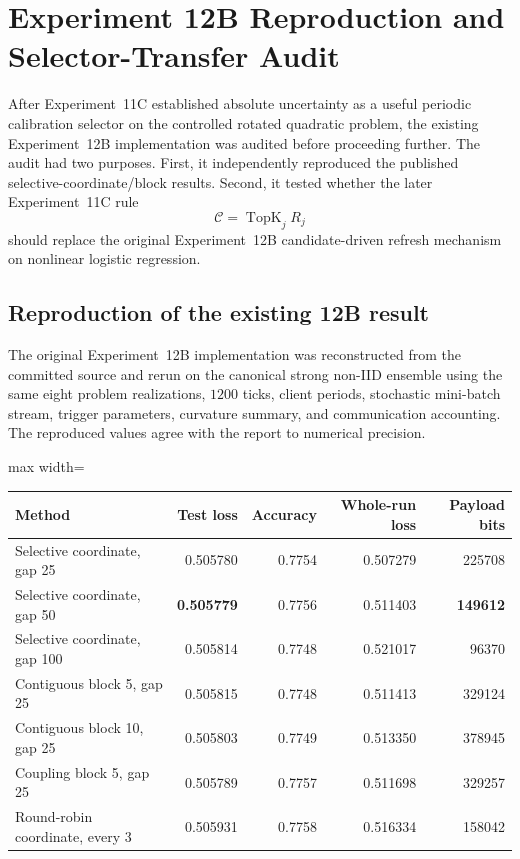 \section{Experiment 12B Reproduction and Selector-Transfer Audit}
\label{sec:exp12b-audit}

After Experiment~11C established absolute uncertainty as a useful periodic calibration selector on the controlled rotated quadratic problem, the existing Experiment~12B implementation was audited before proceeding further. The audit had two purposes. First, it independently reproduced the published selective-coordinate/block results. Second, it tested whether the later Experiment~11C rule
\begin{equation}
  \mathcal C=\operatorname{TopK}_j R_j
\end{equation}
should replace the original Experiment~12B candidate-driven refresh mechanism on nonlinear logistic regression.

\subsection{Reproduction of the existing 12B result}

The original Experiment~12B implementation was reconstructed from the committed source and rerun on the canonical strong non-IID ensemble using the same eight problem realizations, $1200$ ticks, client periods, stochastic mini-batch stream, trigger parameters, curvature summary, and communication accounting. The reproduced values agree with the report to numerical precision.

\begin{center}
\begin{adjustbox}{max width=\textwidth}
\begin{tabular}{lrrrr}
\toprule
Method & Test loss & Accuracy & Whole-run loss & Payload bits\\
\midrule
Selective coordinate, gap 25 & 0.505780 & 0.7754 & 0.507279 & 225708\\
Selective coordinate, gap 50 & \textbf{0.505779} & 0.7756 & 0.511403 & \textbf{149612}\\
Selective coordinate, gap 100 & 0.505814 & 0.7748 & 0.521017 & 96370\\
Contiguous block 5, gap 25 & 0.505815 & 0.7748 & 0.511413 & 329124\\
Contiguous block 10, gap 25 & 0.505803 & 0.7749 & 0.513350 & 378945\\
Coupling block 5, gap 25 & 0.505789 & 0.7757 & 0.511698 & 329257\\
Round-robin coordinate, every 3 & 0.505931 & 0.7758 & 0.516334 & 158042\\
\bottomrule
\end{tabular}
\end{adjustbox}
\end{center}

